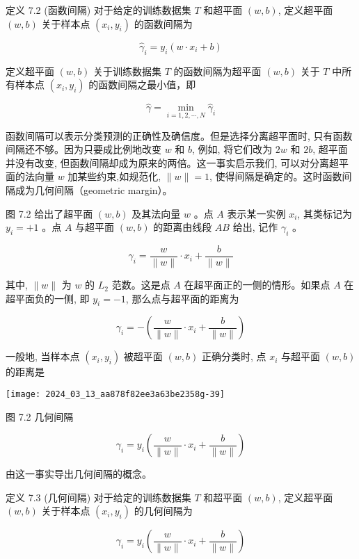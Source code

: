 \documentclass[10pt]{article}
\begin{document}
\begin{CJK*}{UTF8}{bsmi}
定义 7.2 (函数间隔) 对于给定的训练数据集 $T$ 和超平面 $(w, b)$, 定义超平面 $(w, b)$ 关于样本点 $\left(x_{i}, y_{i}\right)$ 的函数间隔为


\begin{equation*}
\hat{\gamma}_{i}=y_{i}\left(w \cdot x_{i}+b\right) \tag{7.3}
\end{equation*}


定义超平面 $(w, b)$ 关于训练数据集 $T$ 的函数间隔为超平面 $(w, b)$ 关于 $T$ 中所有样本点 $\left(x_{i}, y_{i}\right)$ 的函数间隔之最小值，即


\begin{equation*}
\hat{\gamma}=\min _{i=1,2, \cdots, N} \hat{\gamma}_{i} \tag{7.4}
\end{equation*}


函数间隔可以表示分类预测的正确性及确信度。但是选择分离超平面时, 只有函数间隔还不够。因为只要成比例地改变 $w$ 和 $b$, 例如, 将它们改为 $2 w$ 和 $2 b$, 超平面并没有改变, 但函数间隔却成为原来的两倍。这一事实启示我们, 可以对分离超平面的法向量 $w$ 加某些约束,如规范化, $\|w\|=1$, 使得间隔是确定的。这时函数间隔成为几何间隔（geometric margin）。

图 7.2 给出了超平面 $(w, b)$ 及其法向量 $w$ 。点 $A$ 表示某一实例 $x_{i}$, 其类标记为 $y_{i}=+1$ 。点 $A$ 与超平面 $(w, b)$ 的距离由线段 $A B$ 给出, 记作 $\gamma_{i}$ 。

$$
\gamma_{i}=\frac{w}{\|w\|} \cdot x_{i}+\frac{b}{\|w\|}
$$

其中, $\|w\|$ 为 $w$ 的 $L_{2}$ 范数。这是点 $A$ 在超平面正的一侧的情形。如果点 $A$ 在超平面负的一侧, 即 $y_{i}=-1$, 那么点与超平面的距离为

$$
\gamma_{i}=-\left(\frac{w}{\|w\|} \cdot x_{i}+\frac{b}{\|w\|}\right)
$$

一般地, 当样本点 $\left(x_{i}, y_{i}\right)$ 被超平面 $(w, b)$ 正确分类时, 点 $x_{i}$ 与超平面 $(w, b)$ 的距离是

\begin{center}
\texttt{[image: 2024\_03\_13\_aa878f82ee3a63be2358g-39]}
\end{center}

图 7.2 几何间隔

$$
\gamma_{i}=y_{i}\left(\frac{w}{\|w\|} \cdot x_{i}+\frac{b}{\|w\|}\right)
$$

由这一事实导出几何间隔的概念。

定义 7.3 (几何间隔) 对于给定的训练数据集 $T$ 和超平面 $(w, b)$, 定义超平面 $(w, b)$ 关于样本点 $\left(x_{i}, y_{i}\right)$ 的几何间隔为


\begin{equation*}
\gamma_{i}=y_{i}\left(\frac{w}{\|w\|} \cdot x_{i}+\frac{b}{\|w\|}\right) \tag{7.5}
\end{equation*}



\end{CJK*}
\end{document}
